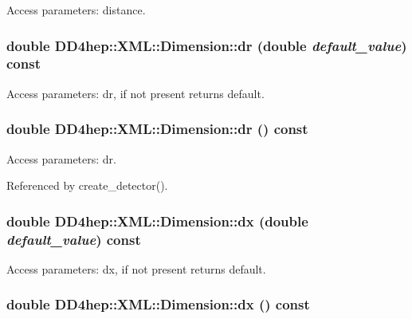 Access parameters: distance. \hypertarget{struct_d_d4hep_1_1_x_m_l_1_1_dimension_a8d34918332fceb9fb20a2dc5e25e4a3c}{
\subsubsection[{dr}]{\setlength{\rightskip}{0pt plus 5cm}double DD4hep::XML::Dimension::dr (double {\em default\_\-value}) const}}
\label{struct_d_d4hep_1_1_x_m_l_1_1_dimension_a8d34918332fceb9fb20a2dc5e25e4a3c}


Access parameters: dr, if not present returns default. \hypertarget{struct_d_d4hep_1_1_x_m_l_1_1_dimension_a0a69f1789a233b07247116e5085c0ea2}{
\subsubsection[{dr}]{\setlength{\rightskip}{0pt plus 5cm}double DD4hep::XML::Dimension::dr () const}}
\label{struct_d_d4hep_1_1_x_m_l_1_1_dimension_a0a69f1789a233b07247116e5085c0ea2}


Access parameters: dr. 

Referenced by create\_\-detector().\hypertarget{struct_d_d4hep_1_1_x_m_l_1_1_dimension_ab81e44eb14ad85a40038017f5a4910e4}{
\subsubsection[{dx}]{\setlength{\rightskip}{0pt plus 5cm}double DD4hep::XML::Dimension::dx (double {\em default\_\-value}) const}}
\label{struct_d_d4hep_1_1_x_m_l_1_1_dimension_ab81e44eb14ad85a40038017f5a4910e4}


Access parameters: dx, if not present returns default. \hypertarget{struct_d_d4hep_1_1_x_m_l_1_1_dimension_a0fc64670a5130b6f673484c3027936a4}{
\subsubsection[{dx}]{\setlength{\rightskip}{0pt plus 5cm}double DD4hep::XML::Dimension::dx () const}}
\label{struct_d_d4hep_1_1_x_m_l_1_1_dimension_a0fc64670a5130b6f673484c3027936a4}


